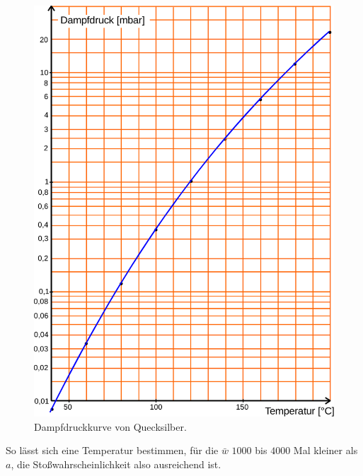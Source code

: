 \begin{figure}
    \centering
    \includegraphics[scale=0.5]{figures/Abb_4.pdf}
    \caption{Dampfdruckkurve von Quecksilber\cite{ap08}.}
    \label{fig:abb4}
\end{figure}

So lässt sich eine Temperatur bestimmen, für die $\bar{w}$  $1000$ bis $4000$ Mal kleiner als $a$, die
Stoßwahrscheinlichkeit also ausreichend ist.

